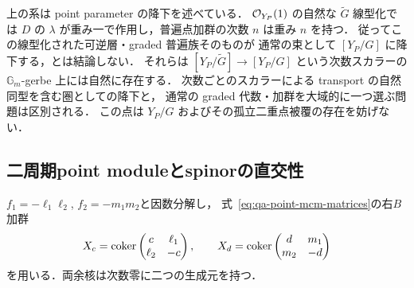 \begin{remark}
上の系は point parameter の降下を述べている．
$\mathcal O_{Y_P}(1)$ の自然な $\widetilde G$ 線型化では
$D$ の $\lambda$ が重み一で作用し，普遍点加群の次数 $n$ は重み $n$ を持つ．
従ってこの線型化された可逆層・graded 普遍族そのものが
通常の束として $[Y_P/G]$ に降下する，とは結論しない．
それらは $[Y_P/\widetilde G]\to[Y_P/G]$ という次数スカラーの
$\mathbb G_m$-gerbe 上には自然に存在する．
次数ごとのスカラーによる transport の自然同型を含む圏としての降下と，
通常の graded 代数・加群を大域的に一つ選ぶ問題は区別される．
この点は $Y_P/G$ およびその孤立二重点被覆の存在を妨げない．
\end{remark}


\subsection{二周期point moduleとspinorの直交性}

$f_1=-\ell_1\ell_2$, $f_2=-m_1m_2$と因数分解し，
式~\eqref{eq:qa-point-mcm-matrices}の右$B$加群
\[
 X_c=\operatorname{coker}\begin{pmatrix}c&\ell_1\\\ell_2&-c\end{pmatrix},
 \qquad
 X_d=\operatorname{coker}\begin{pmatrix}d&m_1\\m_2&-d\end{pmatrix}
\]
を用いる．両余核は次数零に二つの生成元を持つ．

